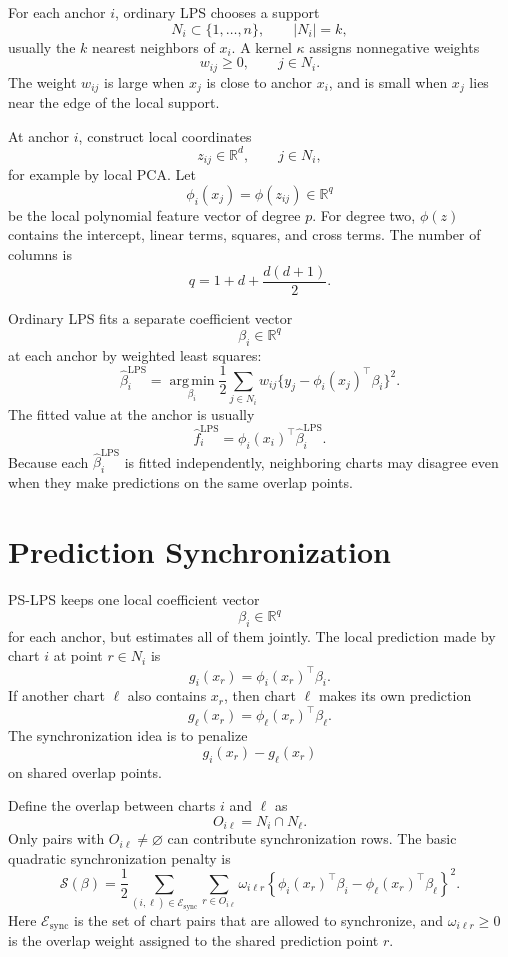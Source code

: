 \documentclass[11pt]{article}
\newcommand{\R}{\mathbb{R}}
\newcommand{\argmin}{\operatorname*{arg\,min}}
\begin{document}
For each anchor \(i\), ordinary LPS chooses a support
\[
  N_i \subset \{1,\ldots,n\},
  \qquad |N_i| = k,
\]
usually the \(k\) nearest neighbors of \(x_i\).  A kernel \(\kappa\) assigns
nonnegative weights
\[
  w_{ij} \ge 0,
  \qquad j\in N_i.
\]
The weight \(w_{ij}\) is large when \(x_j\) is close to anchor \(x_i\), and is
small when \(x_j\) lies near the edge of the local support.

At anchor \(i\), construct local coordinates
\[
  z_{ij}\in\R^d,
  \qquad j\in N_i,
\]
for example by local PCA.  Let
\[
  \phi_{i}(x_j) = \phi(z_{ij})\in\R^q
\]
be the local polynomial feature vector of degree \(p\).  For degree two,
\(\phi(z)\) contains the intercept, linear terms, squares, and cross terms.
The number of columns is
\[
  q = 1+d+\frac{d(d+1)}{2}.
\]

Ordinary LPS fits a separate coefficient vector
\[
  \beta_i\in\R^q
\]
at each anchor by weighted least squares:
\[
  \widehat\beta_i^{\mathrm{LPS}}
  =
  \argmin_{\beta_i}
  \frac12
  \sum_{j\in N_i}
  w_{ij}\{y_j-\phi_i(x_j)^\top\beta_i\}^2.
\]
The fitted value at the anchor is usually
\[
  \widehat f_i^{\mathrm{LPS}}
  =
  \phi_i(x_i)^\top\widehat\beta_i^{\mathrm{LPS}}.
\]
Because each \(\widehat\beta_i^{\mathrm{LPS}}\) is fitted independently,
neighboring charts may disagree even when they make predictions on the same
overlap points.

\section{Prediction Synchronization}

PS-LPS keeps one local coefficient vector
\[
  \beta_i\in\R^q
\]
for each anchor, but estimates all of them jointly.  The local prediction made
by chart \(i\) at point \(r\in N_i\) is
\[
  g_i(x_r) = \phi_i(x_r)^\top\beta_i.
\]
If another chart \(\ell\) also contains \(x_r\), then chart \(\ell\) makes its
own prediction
\[
  g_\ell(x_r) = \phi_\ell(x_r)^\top\beta_\ell.
\]
The synchronization idea is to penalize
\[
  g_i(x_r)-g_\ell(x_r)
\]
on shared overlap points.

Define the overlap between charts \(i\) and \(\ell\) as
\[
  O_{i\ell}=N_i\cap N_\ell.
\]
Only pairs with \(O_{i\ell}\ne\varnothing\) can contribute synchronization
rows.  The basic quadratic synchronization penalty is
\[
  \mathcal S(\beta)
  =
  \frac12
  \sum_{(i,\ell)\in\mathcal E_{\mathrm{sync}}}
  \sum_{r\in O_{i\ell}}
  \omega_{i\ell r}
  \left\{
    \phi_i(x_r)^\top\beta_i
    -
    \phi_\ell(x_r)^\top\beta_\ell
  \right\}^2.
\]
Here \(\mathcal E_{\mathrm{sync}}\) is the set of chart pairs that are allowed
to synchronize, and \(\omega_{i\ell r}\ge 0\) is the overlap weight assigned to
the shared prediction point \(r\).
\end{document}
